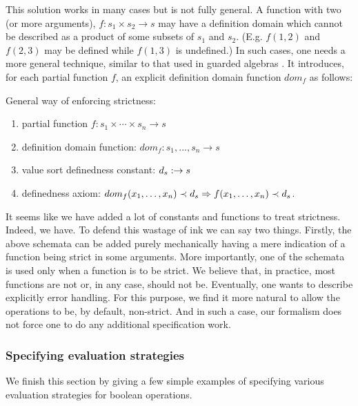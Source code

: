 \documentclass[10pt]{article}
\begin{document}
This solution works in many cases but is not fully general. A function with
two (or more arguments), $f:s_1\times s_2\to s$ may have a definition domain
which cannot be described as a product of some subsets of $s_1$ and
$s_2$. (E.g. $f(1,2)$ and $f(2,3)$ may be defined while $f(1,3)$ is
undefined.)
In such cases, one needs a more general technique, similar to that
used in  guarded algebras \cite{guard}. It introduces, for each partial
function $f$, an explicit definition domain function $dom_f$ as follows:
%
\begin{schem}\label{sch:strict}
General way of enforcing strictness:
\begin{enumerate}\MyLPar
	\item partial function $f: s_1 \times \cdots \times s_n \to s$ 
	\item definition domain function: ${dom}_f:s_1, \ldots , s_n \to s$ 
	\item value sort definedness constant: $d_{s}: \to s$ 
	\item definedness axiom: $dom_f(x_1, \ldots ,x_n) \prec d_{s} \Rightarrow
	f(x_1, \ldots ,x_n) \prec d_{s}$.	
\end{enumerate}
\end{schem}
%
It seems like we have added a lot of constants and functions to treat strictness. Indeed,
we have. To defend this wastage of ink we can say two things. Firstly, 
the above schemata can be added purely mechanically having a mere indication of
a function being strict in some arguments. More importantly, one of the schemata is
used only when a function is to be strict. We believe that, in practice, most
functions are not or, in any case, should not be. Eventually, one wants to
describe explicitly error handling. For this purpose, we find it more natural
to allow the operations to be, by default, non-strict. And in such a case, our formalism
does not force one to do any additional specification work.

\subsubsection{Specifying evaluation strategies}\label{sub:eva}
We finish this section by giving a few simple examples of
specifying various evaluation strategies for boolean operations.
\end{document}
